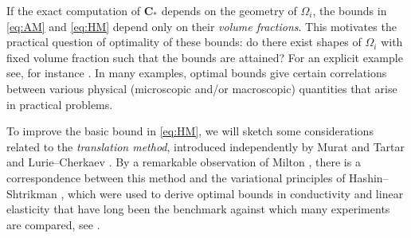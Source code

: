 \documentclass[a4paper]{article}
\numberwithin{equation}{section}
\theoremstyle{definition}
\theoremstyle{remark}
\newcommand{\CC}{\mathbf{C}}
\begin{document}
If the exact computation of $\CC_*$ depends on the geometry of $\Omega_i$, the bounds in \eqref{eq:AM} and \eqref{eq:HM} depend only on their \emph{volume fractions}. This motivates the practical question of optimality of these bounds: do there exist shapes of $\Omega_i$ with fixed volume fraction such that the bounds are attained? For an explicit example see, for instance \cite[Ch. 22.4]{MiltonBook}. In many examples, optimal bounds give certain correlations between various physical (microscopic and/or macroscopic) quantities that arise in practical problems.

To improve the basic bound in \eqref{eq:HM}, we will sketch some considerations related to the \emph{translation method}, introduced independently by Murat and Tartar \cite{MuratTartar,tartar1979,tartar1985} and Lurie--Cherkaev \cite{lurie1984exact}. By a remarkable observation of Milton \cite{MiltonCPAM}, there is a correspondence between this method and the variational principles of Hashin--Shtrikman \cite{hashin1962variational,hashin1963variational}, which were used to derive optimal bounds in conductivity and linear elasticity that have long been the benchmark against which many experiments are compared, see \cite[Ch. 23]{MiltonBook}. 
\end{document}
